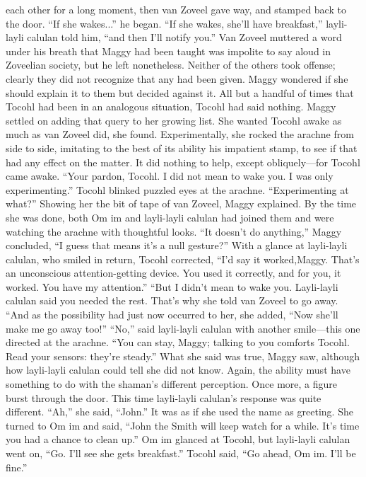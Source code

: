 \documentclass[9pt]{article}
\begin{document}
each other for a long moment, then van Zoveel gave way, and stamped back to the door. “If she
wakes...” he began.
“If she wakes, she’ll have breakfast,” layli-layli calulan told him, “and then I’ll notify you.”
Van Zoveel muttered a word under his breath that Maggy had been taught was impolite to say aloud
in Zoveelian society, but he left nonetheless. Neither of the others took offense; clearly they did not
recognize that any had been given. Maggy wondered if she should explain it to them but decided against
it. All but a handful of times that Tocohl had been in an analogous situation, Tocohl had said nothing.
Maggy settled on adding that query to her growing list.
She wanted Tocohl awake as much as van Zoveel did, she found. Experimentally, she rocked the
arachne from side to side, imitating to the best of its ability his impatient stamp, to see if that had any
effect on the matter. It did nothing to help, except obliquely—for Tocohl came awake.
“Your pardon, Tocohl. I did not mean to wake you. I was only experimenting.”
Tocohl blinked puzzled eyes at the arachne. “Experimenting at what?”
Showing her the bit of tape of van Zoveel, Maggy explained. By the time she was done, both Om im
and layli-layli calulan had joined them and were watching the arachne with thoughtful looks. “It doesn’t
do anything,” Maggy concluded, “I guess that means it’s a null gesture?”
With a glance at layli-layli calulan, who smiled in return, Tocohl corrected, “I’d say it worked,Maggy. That’s an unconscious attention-getting device. You used it correctly, and for you, it worked.
You have my attention.”
“But I didn’t mean to wake you. Layli-layli calulan said you needed the rest. That’s why she told
van Zoveel to go away. “And as the possibility had just now occurred to her, she added, “Now she’ll
make me go away too!”
“No,” said layli-layli calulan with another smile—this one directed at the arachne. “You can stay,
Maggy; talking to you comforts Tocohl. Read your sensors: they’re steady.”
What she said was true, Maggy saw, although how layli-layli calulan could tell she did not know.
Again, the ability must have something to do with the shaman’s different perception.
Once more, a figure burst through the door. This time layli-layli calulan’s response was quite
different. “Ah,” she said, “John.” It was as if she used the name as greeting. She turned to Om im and
said, “John the Smith will keep watch for a while. It’s time you had a chance to clean up.” Om im
glanced at Tocohl, but layli-layli calulan went on, “Go. I’ll see she gets breakfast.”
Tocohl said, “Go ahead, Om im. I’ll be fine.”
\end{document}
